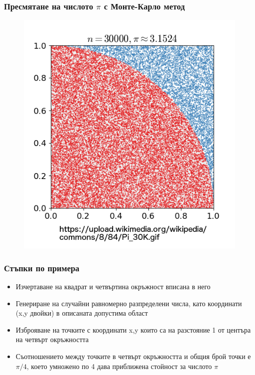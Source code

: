 \documentclass{beamer}
\begin{document}
\begin{frame}
\frametitle{Пресмятане на числото $\pi$ с Монте-Карло метод}
\begin{figure}[]\includegraphics[width=\textwidth,height=0.75\textheight]{pic0060}\end{figure}
\end{frame}

\begin{frame}
\frametitle{Стъпки по примера}
\begin{itemize}
	\item Изчертаване на квадрат и четвъртина окръжност вписана в него

	\item Генериране на случайни равномерно разпределени числа, като координати (x,y двойки) в описаната допустима област

	\item Изброяване на точките с координати x,y които са на разстояние 1 от центъра на четвърт окръжността

	\item Съотношението между точките в четвърт окръжността и общия брой точки е $\pi/4$, което умножено по 4 дава приближена стойност за числото $\pi$ 
\end{itemize}
\end{frame}
\end{document}
